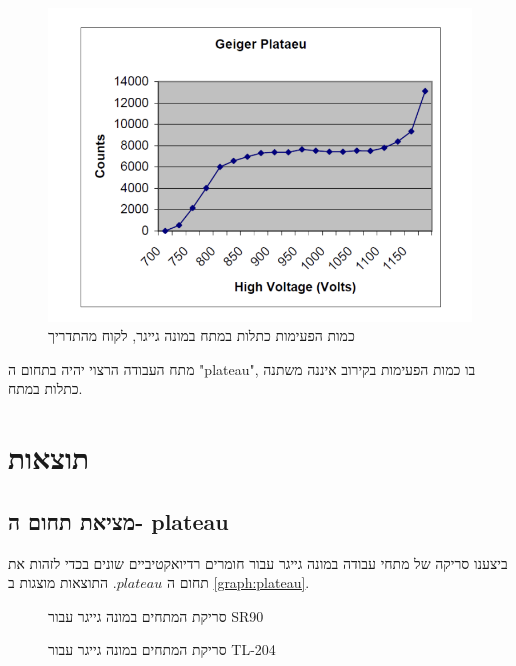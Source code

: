 \documentclass{article}
\begin{document}
\begin{figure}[ht!]
    \centering
    \includegraphics{plateau.png}
    \caption{כמות הפעימות כתלות במתח במונה גייגר, לקוח מהתדריך}
    \label{fig:plateau}
\end{figure}

מתח העבודה הרצוי יהיה בתחום ה
\textenglish{"plateau"},
בו כמות הפעימות בקירוב איננה משתנה כתלות במתח.

\section{
תוצאות
}
\subsection{
מציאת תחום ה-
plateau
}
ביצענו סריקה של מתחי עבודה במונה גייגר עבור חומרים רדיואקטיביים שונים בכדי לזהות את תחום ה
$plateau$.
התוצאות מוצגות ב
\ref{graph:plateau}.

\begin{graph}[H]
    \centering
    \begin{subfigure}[b]{0.49\textwidth}
    	\centering
    	\resizebox{\textwidth}{!}{}
    	\caption{ סריקת המתחים במונה גייגר עבור
    	SR90}
    
    \end{subfigure}
    \hfill
    \begin{subfigure}[b]{0.49\textwidth}
    	\centering
    	\resizebox{\textwidth}{!}{}
        \caption{סריקת המתחים במונה גייגר עבור TL-204}
    \end{subfigure}
    \label{graph:plateau}
\end{graph}
\end{document}
